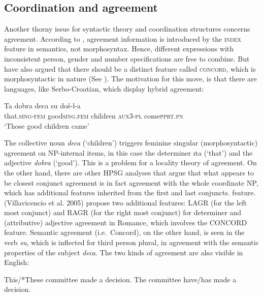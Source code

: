\documentclass[output=paper
                ,modfonts
                ,nonflat
	        ,collection
	        ,collectionchapter
	        ,collectiontoclongg
 	        ,biblatex
                ,babelshorthands
                ,newtxmath
                ,draftmode
                ,colorlinks, citecolor=brown
]{./langsci/langscibook}
\begin{document}
\subsection{Coordination and agreement}


Another thorny issue for syntactic theory and coordination structures concerns agreement. According to 
\citet{pollardsag}, agreement information is introduced by the \textsc{index} feature in semantics, not morphosyntax. Hence, different expressions
with inconsistent person, gender and number specifications are free to combine. But \citet{wechsler} have also argued that there should be a distinct feature called \textsc{concord}, which is morphosyntactic in nature (See ). The motivation for this move, is that there are languages, like Serbo-Croatian,
which display hybrid agreement:

\begin{exe}
\ex \gll Ta dobra deca su do\v{s}-l-a\\
         that.\textsc{sing-fem} good\textsc{sing.fem} children \textsc{aux}\textsc{3-pl} come\textsc{pprt.pn}\\
  \glt `Those good children came'   \\
  \citep[51]{wechsler} 
\end{exe}

\noindent
The collective noun \emph{deca} (`children') triggers feminine singular (morphosyntactic) agreement on NP-internal items, in this case the determiner {\i ta} (`that') and the adjective \emph{dobra} (`good').   This is a problem for a locality theory of agreement. On the other hand, there are other HPSG analyses that argue that what appears to be closest conjunct agreement is in fact agreement with the whole coordinate NP, which has additional features inherited from the first and last conjuncts. feature. (Villavicencio et al. 2005) propose two additional features: LAGR (for the left most conjunct) and RAGR (for the right most conjunct) for determiner and (attributive) adjective agreement in Romance, which involves the CONCORD feature.
Semantic agreement (i.e.\ Concord), on the other hand, is seen in the verb \emph{su}, which  is inflected for third person plural, in agreement with the semantic properties of the subject \emph{deca}. The two kinds of agreement are also visible in
English:

\begin{exe}
\ex
\begin{xlista}
\ex This/*These committee made a decision.
\ex The committee have/has made a decision.
\end{xlista}
\end{exe}
\end{document}
